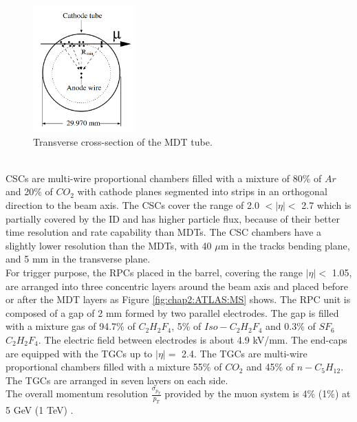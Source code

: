 \begin{figure}[htbp]
    \centering
    \includegraphics[width=0.35\textwidth]{Ch2/Img/Tube.png}
    \caption{Transverse cross-section of the MDT tube.}
    \label{fig:chap2:ATLAS:MS:Tube}
\end{figure}
\\
CSCs are multi-wire proportional chambers filled with a mixture of 80\% of $Ar$ and 20\% of $CO_2$ with cathode planes segmented into strips in an orthogonal direction to the beam axis. The CSCs cover the range of 2.0 $ < |\eta| < $ 2.7 which is partially covered by the ID and has higher particle flux, because of their better time resolution and rate capability than MDTs. The CSC chambers have a slightly lower resolution than the MDTs, with 40 $\mu$m in the tracks bending plane, and 5 mm in the transverse plane. \\
For trigger purpose, the RPCs placed in the barrel, covering the range $|\eta| < $ 1.05,  are arranged into three concentric layers around the beam axis and placed before or after the MDT layers as Figure \ref{fig:chap2:ATLAS:MS} shows. The RPC unit is composed of a gap of 2 mm formed by two parallel electrodes. The gap is filled with a mixture gas of 94.7\% of $C_2H_2F_4$, 5\% of $Iso-C_2H_2F_4$ and 0.3\% of $SF_6$ $C_2H_2F_4$. The electric field between electrodes is about 4.9 kV/mm. The end-caps are equipped with the TGCs up to $|\eta| = $ 2.4. The TGCs are multi-wire proportional chambers filled with a mixture 55\% of $CO_2$ and 45\% of $n-C_5H_{12}$. The TGCs are arranged in seven layers on each side.\\
The overall momentum resolution $\frac{\sigma_{p_T}}{p_T}$ provided by the muon system is 4\% (1\%) at 5 GeV (1 TeV) \cite{ATLAS_Perf}.

